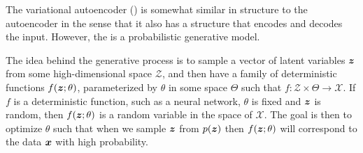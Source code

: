


The variational autoencoder (\vae{}) is somewhat similar in structure to the autoencoder in the sense that it also has a structure that encodes and decodes the input. However, the \vae{} is a probabilistic generative model.



The idea behind the generative process is to sample a vector of latent variables $\boldsymbol{z}$ from some high-dimensional space $\mathcal{Z}$, and then have a family of deterministic functions $f(\boldsymbol{z};\theta)$, parameterized by $\theta$ in some space $\Theta$ such that $f: \mathcal{Z} \times \Theta \rightarrow \mathcal{X}$. If $f$ is a deterministic function, such as a neural network, $\theta$ is fixed and $\boldsymbol{z}$ is random, then $f(\boldsymbol{z};\theta)$ is a random variable in the space of $\mathcal{X}$. The goal is then to optimize $\theta$ such that when we sample $\boldsymbol{z}$ from $p(\boldsymbol{z})$ then $f(\boldsymbol{z};\theta)$ will correspond to the data $\boldsymbol{x}$ with high probability.

